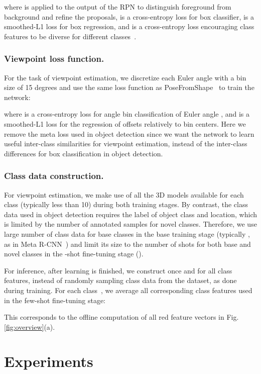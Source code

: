 \documentclass[runningheads]{llncs}
\begin{document}
where  is applied to the output of the RPN to distinguish foreground from background and refine the proposals,  is a cross-entropy loss for box classifier,  is a smoothed-L1 loss for box regression, and  is a cross-entropy loss encouraging class features to be diverse for different classes~\cite{metarcnn2019}.

\subsubsection{Viewpoint loss function.}
For the task of viewpoint estimation, we discretize each Euler angle with a bin size of 15 degrees and use the same loss function as PoseFromShape~\cite{Xiao2019PoseFromShape} to train the network:

where  is a cross-entropy loss for angle bin classification of Euler angle , and  is a smoothed-L1 loss for the regression of offsets relatively to bin centers.
Here we remove the meta loss  used in object detection since we want the network to learn useful inter-class similarities for viewpoint estimation, instead of the inter-class differences for box classification in object detection.


\subsubsection{Class data construction.}
For viewpoint estimation, we make use of all the 3D models available for each class (typically less than 10) during both training stages.
By contrast, the class data used in object detection requires the label of object class and location, which is limited by the number of annotated samples for novel classes.
Therefore, we use large number of class data for base classes in the base training stage (typically , as in Meta R-CNN~\cite{metarcnn2019}) and limit its size to the number of shots for both base and novel classes in the -shot fine-tuning stage ().

For inference, after learning is finished, we construct once and for all class features, instead of randomly sampling class data from the dataset, as done during training. For each class~, we average all corresponding class features used in the few-shot fine-tuning stage:

This corresponds to the offline computation of all red feature vectors in Fig.\,\ref{fig:overview}(a).



\section{Experiments}
\end{document}
